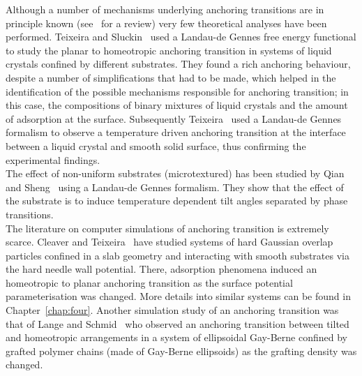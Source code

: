 Although a number of mechanisms underlying anchoring transitions are in principle known
(see~\cite{Sluckin95} for a review) very few theoretical analyses have been performed. 
Teixeira and Sluckin~\cite{TeixeiraSluckin92,TeixeiraSluckin92a} used a Landau-de Gennes free
energy functional to study the planar to homeotropic anchoring transition in systems of liquid
crystals confined by different substrates. They found a rich anchoring behaviour, despite 
a number of simplifications that had to be made, which helped in the identification of the
possible mechanisms responsible for anchoring transition; in this case, the compositions
of binary mixtures of liquid crystals and the amount of adsorption at the surface. Subsequently 
Teixeira~\etal\cite{TeixeiraSluckin93} used a Landau-de Gennes formalism to observe
a temperature driven anchoring transition at the interface between a liquid crystal and smooth 
solid surface, thus confirming the experimental findings.\\
The effect of non-uniform substrates (\ie microtextured) has been studied by Qian and
Sheng~\cite{ZhengQianSheng96,ZhengQianSheng97} using a Landau-de Gennes formalism. They show
that the effect of the substrate is to induce temperature dependent tilt angles separated by
phase transitions.\\
%
The literature on computer simulations of anchoring transition is extremely scarce. 
Cleaver and Teixeira~\cite{Cleaver_Teixeira_01} have studied systems of hard Gaussian
overlap particles confined in a slab geometry and interacting with smooth substrates via the
hard needle wall potential. There, adsorption phenomena induced an homeotropic to planar
anchoring transition as the surface potential parameterisation was changed. More details into
similar systems can be found in Chapter~\ref{chap:four}.
Another simulation study of an anchoring transition was that of
Lange and Schmid~\cite{LangeSchmid02,LangeSchmid02a,LangeSchmid02c} who 
observed an anchoring transition between tilted and homeotropic arrangements
in a system of ellipsoidal Gay-Berne confined by grafted polymer chains (made of
Gay-Berne ellipsoids) as the grafting density was changed.




